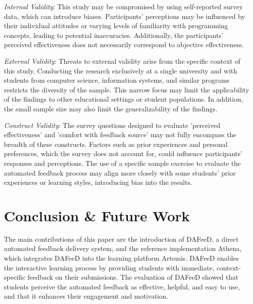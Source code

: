 \documentclass[manuscript,screen,review]{acmart}
\begin{document}
\textit{Internal Validity}: This study may be compromised by using self-reported survey data, which can introduce biases. 
Participants' perceptions may be influenced by their individual attitudes or varying levels of familiarity with programming concepts, leading to potential inaccuracies.
Additionally, the participants' perceived effectiveness does not necessarily correspond to objective effectiveness.

\textit{External Validity}: Threats to external validity arise from the specific context of this study. 
Conducting the research exclusively at a single university and with students from computer science, information systems, and similar programs restricts the diversity of the sample. 
This narrow focus may limit the applicability of the findings to other educational settings or student populations. 
In addition, the small sample size may also limit the generalizability of the findings.

\textit{Construct Validity}: 
The survey questions designed to evaluate 'perceived effectiveness' and 'comfort with feedback source' may not fully encompass the breadth of these constructs.
Factors such as prior experiences and personal preferences, which the survey does not account for, could influence participants' responses and perceptions.
The use of a specific sample exercise to evaluate the automated feedback process may align more closely with some students' prior experiences or learning styles, introducing bias into the results.


\section{Conclusion \& Future Work} %
\label{sec:conclusion}

The main contributions of this paper are the introduction of DAFeeD, a direct automated feedback delivery system, and the reference implementation Athena, which integrates DAFeeD into the learning platform Artemis.
DAFeeD enables the interactive learning process by providing students with immediate, context-specific feedback on their submissions.
The evaluation of DAFeeD showed that students perceive the automated feedback as effective, helpful, and easy to use, and that it enhances their engagement and motivation.
\end{document}
